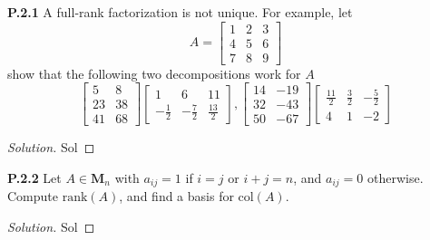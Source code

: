 \documentclass[12pt]{amsart}
\newenvironment{solution}
{\begin{proof}[Solution]}
{\end{proof}}
\begin{document}
\begin{onehalfspace}
        \noindent\textbf{P.2.1} A full-rank factorization is not unique.
        For example, let
        \begin{displaymath}
            A = \left[
                    \begin{matrix}
                        1 & 2 & 3 \\
                        4 & 5 & 6 \\
                        7 & 8 & 9
                    \end{matrix}
            \right]
        \end{displaymath}
        show that the following two decompositions work for $A$
        \begin{displaymath}
            \left[\begin{matrix}
                      5 & 8 \\
                      23 & 38 \\
                      41 & 68
            \end{matrix}\right]
            \left[\begin{matrix}
                      1 & 6 & 11 \\
                      -\frac{1}{2} & -\frac{7}{2} & \frac{13}{2}
            \end{matrix}\right],
            \left[\begin{matrix}
                      14 & -19 \\
                      32 &-43 \\
                      50 & -67
            \end{matrix}\right]
            \left[\begin{matrix}
                      \frac{11}{2} & \frac{3}{2} & -\frac{5}{2} \\
                      4 & 1 & -2
            \end{matrix}\right]
        \end{displaymath}
        \begin{solution}
            Sol
        \end{solution}

        \noindent\textbf{P.2.2} Let $A\in\mathbf{M}_n$ with $a_{ij} = 1$ if $i = j$ or $i + j = n$, and $a_{ij} = 0$
        otherwise.
        Compute $\text{rank}(A)$, and find a basis for $\text{col}(A)$.
        \begin{solution}
            Sol
        \end{solution}


\end{onehalfspace}
\end{document}
